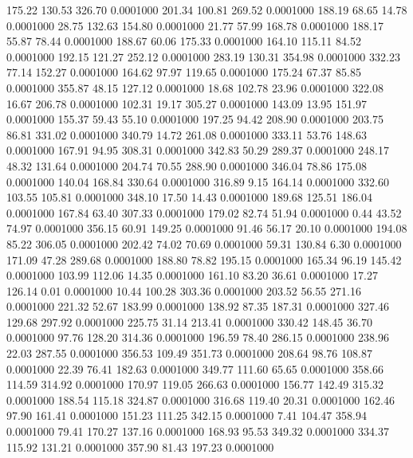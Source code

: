  175.22  130.53  326.70   0.0001000
 201.34  100.81  269.52   0.0001000
 188.19   68.65   14.78   0.0001000
  28.75  132.63  154.80   0.0001000
  21.77   57.99  168.78   0.0001000
 188.17   55.87   78.44   0.0001000
 188.67   60.06  175.33   0.0001000
 164.10  115.11   84.52   0.0001000
 192.15  121.27  252.12   0.0001000
 283.19  130.31  354.98   0.0001000
 332.23   77.14  152.27   0.0001000
 164.62   97.97  119.65   0.0001000
 175.24   67.37   85.85   0.0001000
 355.87   48.15  127.12   0.0001000
  18.68  102.78   23.96   0.0001000
 322.08   16.67  206.78   0.0001000
 102.31   19.17  305.27   0.0001000
 143.09   13.95  151.97   0.0001000
 155.37   59.43   55.10   0.0001000
 197.25   94.42  208.90   0.0001000
 203.75   86.81  331.02   0.0001000
 340.79   14.72  261.08   0.0001000
 333.11   53.76  148.63   0.0001000
 167.91   94.95  308.31   0.0001000
 342.83   50.29  289.37   0.0001000
 248.17   48.32  131.64   0.0001000
 204.74   70.55  288.90   0.0001000
 346.04   78.86  175.08   0.0001000
 140.04  168.84  330.64   0.0001000
 316.89    9.15  164.14   0.0001000
 332.60  103.55  105.81   0.0001000
 348.10   17.50   14.43   0.0001000
 189.68  125.51  186.04   0.0001000
 167.84   63.40  307.33   0.0001000
 179.02   82.74   51.94   0.0001000
   0.44   43.52   74.97   0.0001000
 356.15   60.91  149.25   0.0001000
  91.46   56.17   20.10   0.0001000
 194.08   85.22  306.05   0.0001000
 202.42   74.02   70.69   0.0001000
  59.31  130.84    6.30   0.0001000
 171.09   47.28  289.68   0.0001000
 188.80   78.82  195.15   0.0001000
 165.34   96.19  145.42   0.0001000
 103.99  112.06   14.35   0.0001000
 161.10   83.20   36.61   0.0001000
  17.27  126.14    0.01   0.0001000
  10.44  100.28  303.36   0.0001000
 203.52   56.55  271.16   0.0001000
 221.32   52.67  183.99   0.0001000
 138.92   87.35  187.31   0.0001000
 327.46  129.68  297.92   0.0001000
 225.75   31.14  213.41   0.0001000
 330.42  148.45   36.70   0.0001000
  97.76  128.20  314.36   0.0001000
 196.59   78.40  286.15   0.0001000
 238.96   22.03  287.55   0.0001000
 356.53  109.49  351.73   0.0001000
 208.64   98.76  108.87   0.0001000
  22.39   76.41  182.63   0.0001000
 349.77  111.60   65.65   0.0001000
 358.66  114.59  314.92   0.0001000
 170.97  119.05  266.63   0.0001000
 156.77  142.49  315.32   0.0001000
 188.54  115.18  324.87   0.0001000
 316.68  119.40   20.31   0.0001000
 162.46   97.90  161.41   0.0001000
 151.23  111.25  342.15   0.0001000
   7.41  104.47  358.94   0.0001000
  79.41  170.27  137.16   0.0001000
 168.93   95.53  349.32   0.0001000
 334.37  115.92  131.21   0.0001000
 357.90   81.43  197.23   0.0001000
